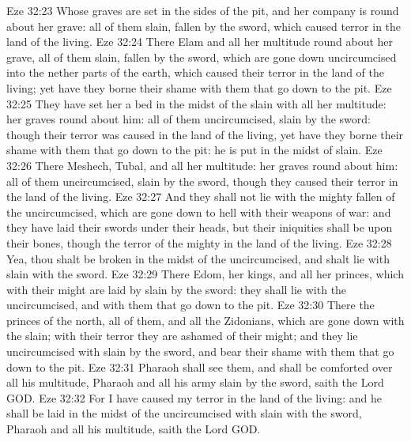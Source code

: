 \vs Eze 32:23 Whose graves are set in the sides of the pit, and her company is round about her grave: all of them slain, fallen by the sword, which caused terror in the land of the living.
\vs Eze 32:24 There  Elam and all her multitude round about her grave, all of them slain, fallen by the sword, which are gone down uncircumcised into the nether parts of the earth, which caused their terror in the land of the living; yet have they borne their shame with them that go down to the pit.
\vs Eze 32:25 They have set her a bed in the midst of the slain with all her multitude: her graves  round about him: all of them uncircumcised, slain by the sword: though their terror was caused in the land of the living, yet have they borne their shame with them that go down to the pit: he is put in the midst of  slain.
\vs Eze 32:26 There  Meshech, Tubal, and all her multitude: her graves  round about him: all of them uncircumcised, slain by the sword, though they caused their terror in the land of the living.
\vs Eze 32:27 And they shall not lie with the mighty  fallen of the uncircumcised, which are gone down to hell with their weapons of war: and they have laid their swords under their heads, but their iniquities shall be upon their bones, though  the terror of the mighty in the land of the living.
\vs Eze 32:28 Yea, thou shalt be broken in the midst of the uncircumcised, and shalt lie with  slain with the sword.
\vs Eze 32:29 There  Edom, her kings, and all her princes, which with their might are laid by  slain by the sword: they shall lie with the uncircumcised, and with them that go down to the pit.
\vs Eze 32:30 There  the princes of the north, all of them, and all the Zidonians, which are gone down with the slain; with their terror they are ashamed of their might; and they lie uncircumcised with  slain by the sword, and bear their shame with them that go down to the pit.
\vs Eze 32:31 Pharaoh shall see them, and shall be comforted over all his multitude,  Pharaoh and all his army slain by the sword, saith the Lord GOD.
\vs Eze 32:32 For I have caused my terror in the land of the living: and he shall be laid in the midst of the uncircumcised with  slain with the sword,  Pharaoh and all his multitude, saith the Lord GOD.
